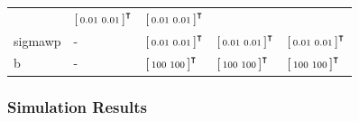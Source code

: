 \begin{table}[ht]
\begin{center}
\begin{tabular}{p{}>{\centering\arraybackslash}p{}>{\centering\arraybackslash}p{}>{\centering\arraybackslash}p{}>{\centering\arraybackslash}p{}}
			& $\begin{bsmallmatrix}0.01 & 0.01\end{bsmallmatrix}^\intercal$ 
			& $\begin{bsmallmatrix}0.01 & 0.01\end{bsmallmatrix}^\intercal$ \\
			\gls{sigmawp} & - & $\begin{bsmallmatrix}0.01 & 0.01\end{bsmallmatrix}^\intercal$
			& $\begin{bsmallmatrix}0.01 & 0.01\end{bsmallmatrix}^\intercal$ 
			& $\begin{bsmallmatrix}0.01 & 0.01\end{bsmallmatrix}^\intercal$ \\
			\gls{b} & - & $\begin{bsmallmatrix}100 & 100\end{bsmallmatrix}^\intercal$
			& $\begin{bsmallmatrix}100 & 100\end{bsmallmatrix}^\intercal$ 
			& $\begin{bsmallmatrix}100 & 100\end{bsmallmatrix}^\intercal$ \\
			\hline
		\end{tabular}
	\end{center}
\end{table}

\subsubsection{Simulation Results}

